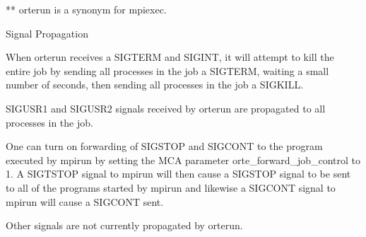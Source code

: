 ** orterun is a synonym for mpiexec.

Signal Propagation

When orterun receives a SIGTERM and SIGINT, it will attempt to kill the entire
job by sending all processes in the job a SIGTERM, waiting a small number of
seconds, then sending all processes in the job a SIGKILL.

SIGUSR1 and SIGUSR2 signals received by orterun are propagated to all processes in the job.

One can turn on forwarding of SIGSTOP and SIGCONT to the program executed by
mpirun by setting the MCA  parameter  orte_forward_job_control to 1. A
SIGTSTOP signal to mpirun will then cause a SIGSTOP signal to be sent to all
of the programs started by mpirun and likewise a SIGCONT signal to mpirun will
cause a SIGCONT sent.

Other signals are not currently propagated by orterun.

